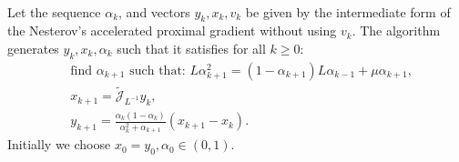 \documentclass[12pt]{article}
\begin{document}
    \begin{theorem}
        \; \\
        Let the sequence $\alpha_k$, and vectors $y_k, x_k, v_k$ be given by the intermediate form of the Nesterov's accelerated proximal gradient without using $v_k$. 
        The algorithm generates $y_k, x_k, \alpha_k$ such that it satisfies for all $k \ge 0$: 
        \begin{align*}
            & \text{find } \alpha_{k + 1} \text{ such that: }L \alpha_{k + 1}^2 = (1 - \alpha_{k + 1})L \alpha_{k - 1} + \mu \alpha_{k + 1}, 
            \\
            & x_{k + 1} = \widetilde {\mathcal J}_{L^{-1}} y_k, 
            \\
            & y_{k + 1} = \frac{\alpha_k(1 - \alpha_k)}{\alpha_k^2 + \alpha_{k + 1}}(x_{k + 1} - x_k). 
        \end{align*}
        Initially we choose $x_0 = y_0, \alpha_0 \in (0, 1)$. 
    \end{theorem}
\end{document}
